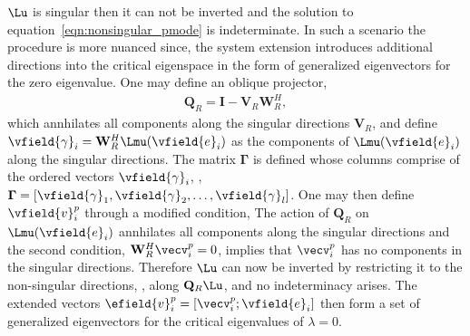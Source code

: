 $\Lu$ is singular then it can not be inverted and the solution to equation~\ref{eqn:nonsingular_pmode} is indeterminate. In such a scenario the procedure is more nuanced since, the system extension introduces additional directions into the critical eigenspace in the form of generalized eigenvectors for the zero eigenvalue. One may define an oblique projector,
\begin{eqnarray}
	\label{eqn:real_annhilator}
	\mathbf{Q}_{R} = \mathbf{I} - \mathbf{V}_{R}\mathbf{W}^{H}_{R},
\end{eqnarray}
which annhilates all components along the singular directions $\mathbf{V}_{R}$, and define $\vfield{\gamma}_{i} = \mathbf{W}^{H}_{R}\Lmu(\vfield{e}_{i})$ as the components of $\Lmu(\vfield{e}_{i})$ along the singular directions. The matrix $\mathbf{\Gamma}$ is defined whose columns comprise of the ordered vectors $\vfield{\gamma}_{i}$, \ie, $\mathbf{\Gamma} = [\vfield{\gamma}_{1},\vfield{\gamma}_{2},\ldots,\vfield{\gamma}_{l}]$. One may then define $\vfield{v}^{p}_{i}$ through a modified condition,
The action of $\mathbf{Q}_{R}$ on $\Lmu(\vfield{e}_{i})$ annhilates all components along the singular directions and the second condition, $\mathbf{W}^{H}_{R}\vecv^{p}_{i}=0$, implies that $\vecv^{p}_{i}$ has no components in the singular directions. Therefore $\Lu$ can now be inverted by restricting it to the non-singular directions, \ie, along $\mathbf{Q}_{R}\Lu$, and no indeterminacy arises. The extended vectors $\efield{v}^{p}_{i} = [\vecv^{p}_{i};\vfield{e}_{i}]$ then form a set of generalized eigenvectors for the critical eigenvalues of $\lambda = 0$. 


